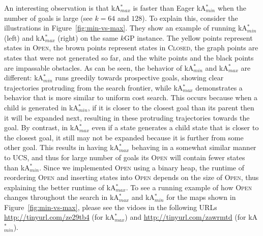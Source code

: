 \documentclass{aicom2e}
\newcommand{\kgs}{$k$GP}
\newcommand{\kastar}{kA$^*$}
\newcommand{\kastarmin}{kA$^*_{min}$}
\newcommand{\kastarmax}{kA$^*_{max}$}
\newcommand{\open}{\textsc{Open}}
\newcommand{\closed}{\textsc{Closed}}
\newcommand{\roni}[1]{\textbf{[RS:#1]}}
\begin{document}
An interesting observation is that \kastarmax{} is faster than Eager \kastarmin{} 
when the number of goals is large (see $k=64$ and $128$). To explain this, consider the illustrations in Figure~\ref{fig:min-vs-max}. They show an example of running \kastarmin{} (left) and \kastarmax{} (right) on the same \kgs{} instance. The yellow points represent states in \open{}, the brown points represent states in \closed{}, the graph points are states that were not generated so far, and the white points and the black points are impassable obstacles. As can be seen, the behavior of \kastarmin{} and \kastarmax{} are different: \kastarmin{} runs greedily towards prospective goals, showing clear trajectories protruding from the search frontier, while \kastarmax{} demonstrates a behavior that is more similar to uniform cost search. This occurs  because when a child is generated in \kastarmin{}, if it is closer to the closest goal than its parent then it will be expanded next, resulting in these protruding trajectories towards the goal. By contrast, in \kastarmax{} even if a state generates a child state that is closer to the closest goal, it still may not be expanded because it is further from some other goal. This results in having \kastarmax{} behaving in a somewhat similar manner to UCS, and thus for large number of goals its \open{} will contain fewer states than \kastarmin{}. Since we implemented \open{} using a binary heap, the runtime of reordering \open{} and inserting states into \open{} depends on the size of \open{}, thus explaining the better runtime of \kastarmax{}. 
To see a running example of how \open{} changes throughout the search in \kastarmax{} and \kastarmin{} for the maps shown in Figure~\ref{fig:min-vs-max}, please see the vidoes in the following URLs \url{http://tinyurl.com/ze29tb4} (for \kastarmax) and 
\url{http://tinyurl.com/zawrmtd} (for \kastarmin).






\end{document}
